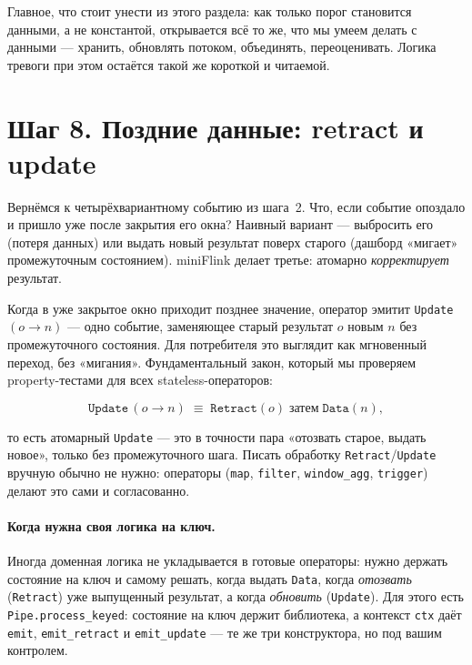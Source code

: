 \documentclass[11pt,a4paper]{article}
\begin{document}
\medskip
\noindent
Главное, что стоит унести из этого раздела: как только порог становится
данными, а не константой, открывается всё то же, что мы умеем делать с
данными --- хранить, обновлять потоком, объединять, переоценивать. Логика
тревоги при этом остаётся такой же короткой и читаемой.

\section{Шаг 8. Поздние данные: retract и update}

Вернёмся к четырёхвариантному событию из шага~2. Что, если событие
опоздало и пришло уже после закрытия его окна? Наивный вариант ---
выбросить его (потеря данных) или выдать новый результат поверх
старого (дашборд «мигает» промежуточным состоянием). miniFlink делает
третье: атомарно \emph{корректирует} результат.

Когда в уже закрытое окно приходит позднее значение, оператор эмитит
\texttt{Update}\,$(o \to n)$ --- одно событие, заменяющее старый
результат $o$ новым $n$ без промежуточного состояния. Для потребителя
это выглядит как мгновенный переход, без «мигания». Фундаментальный
закон, который мы проверяем property-тестами для всех stateless-операторов:

\[
\mathtt{Update}\,(o \to n) \;\equiv\;
\mathtt{Retract}(o)\;\text{затем}\;\mathtt{Data}(n),
\]

то есть атомарный \texttt{Update} --- это в точности пара
«отозвать старое, выдать новое», только без промежуточного шага.
Писать обработку \texttt{Retract}/\texttt{Update} вручную обычно не
нужно: операторы (\texttt{map}, \texttt{filter}, \texttt{window\_agg},
\texttt{trigger}) делают это сами и согласованно.

\paragraph{Когда нужна своя логика на ключ.} Иногда доменная логика не
укладывается в готовые операторы: нужно держать состояние на ключ и
самому решать, когда выдать \texttt{Data}, когда \emph{отозвать}
(\texttt{Retract}) уже выпущенный результат, а когда \emph{обновить}
(\texttt{Update}). Для этого есть \texttt{Pipe.process\_keyed}: состояние
на ключ держит библиотека, а контекст \texttt{ctx} даёт \texttt{emit},
\texttt{emit\_retract} и \texttt{emit\_update} --- те же три
конструктора, но под вашим контролем.
\end{document}
